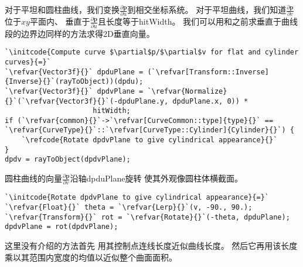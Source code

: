 对于平坦和圆柱曲线，我们变换$\displaystyle\frac{\partial \bm p}{\partial u}$到相交坐标系统。
对于平坦曲线，我们知道$\displaystyle\frac{\partial \bm p}{\partial v}$位于$xy$平面内、
垂直于$\displaystyle\frac{\partial \bm p}{\partial u}$且长度等于{\ttfamily hitWidth}。
我们可以用和之前求垂直于曲线段的边界边同样的方法求得2D垂直向量。
\begin{lstlisting}
`\initcode{Compute curve $\partial$p/$\partial$v for flat and cylinder curves}{=}`
`\refvar{Vector3f}{}` dpduPlane = (`\refvar[Transform::Inverse]{Inverse}{}`(rayToObject))(dpdu);
`\refvar{Vector3f}{}` dpdvPlane = `\refvar{Normalize}{}`(`\refvar{Vector3f}{}`(-dpduPlane.y, dpduPlane.x, 0)) *
                     hitWidth;
if (`\refvar{common}{}`->`\refvar[CurveCommon::type]{type}{}` == `\refvar{CurveType}{}`::`\refvar[CurveType::Cylinder]{Cylinder}{}`) {
    `\refcode{Rotate dpdvPlane to give cylindrical appearance}{}`
}
dpdv = rayToObject(dpdvPlane);
\end{lstlisting}

圆柱曲线的向量$\displaystyle\frac{\partial \bm p}{\partial v}$沿轴{\ttfamily dpduPlane}旋转
使其外观像圆柱体横截面。
\begin{lstlisting}
`\initcode{Rotate dpdvPlane to give cylindrical appearance}{=}`
`\refvar{Float}{}` theta = `\refvar{Lerp}{}`(v, -90., 90.);
`\refvar{Transform}{}` rot = `\refvar{Rotate}{}`(-theta, dpduPlane);
dpdvPlane = rot(dpdvPlane);
\end{lstlisting}

这里没有介绍的方法首先
用其控制点连线长度近似曲线长度。
然后它再用该长度乘以其范围内宽度的均值以近似整个曲面面积。